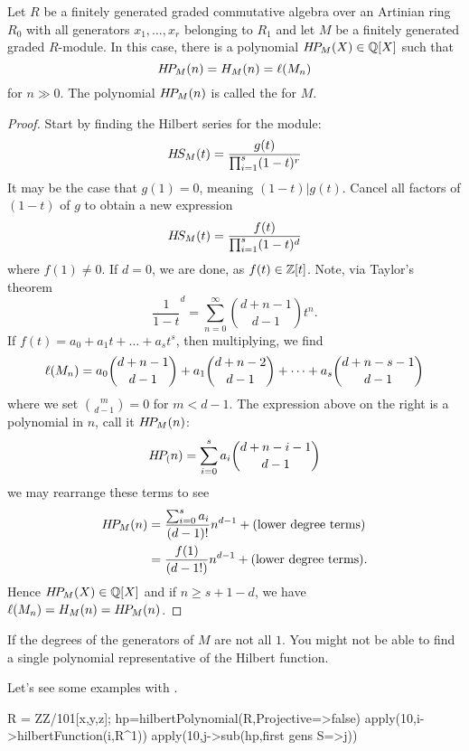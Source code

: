 \documentclass{ximera}
\begin{document}
\begin{corollary}
  Let $R$ be a finitely generated graded commutative algebra over an
  Artinian ring $R_0$ with all generators $x_1,\dots,x_r$ belonging to
  $R_1$ and let $M$ be a finitely generated graded $R$-module. In this
  case, there is a polynomial $H\!P_M(X)\in\mathbb Q[X]$ such that
  \[
  H\!P_M(n) = H_M(n) = \ell(M_n)
  \]
  for $n\gg 0$. The polynomial $H\!P_M(n)$ is called the
   for $M$.
  \begin{proof}
    Start by finding the Hilbert series for the module:
    \[
    H\!S_M(t) = \frac{g(t)}{\prod_{i=1}^s(1-t)^r}
    \]
    It may be the case that $g(1) = 0$, meaning $(1-t)|g(t)$. Cancel
    all factors of $(1-t)$ of $g$ to obtain a new expression
    \[
    H\!S_M(t) = \frac{f(t)}{\prod_{i=1}^s(1-t)^d}
    \]
    where $f(1) \ne 0$. If $d=0$, we are done, as $f(t)\in
    \mathbb Z[t]$. Note, via Taylor's theorem
    \[
    \frac{1}{1-t}^d = \sum_{n=0}^\infty \binom{d+n-1}{d-1}t^n.
    \]
    If $f(t) = a_0 + a_1 t + \dots + a_s t^s$, then multiplying, we find
    \[
    \ell(M_n) = a_0 \binom{d+n-1}{d-1} + a_1 \binom{d+n-2}{d-1} + \dots + a_s \binom{d+n-s-1}{d-1}
    \]
    where we set $\binom{m}{d-1} = 0$ for $m<d-1$. The expression
    above on the right is a polynomial in $n$, call it $H\!P_M(n)$:
    \[
    H\!P_(n) = \sum_{i=0}^s a_i \binom{d+n-i-1}{d-1}
    \]
    we may rearrange these terms to see
    \begin{align*}
    H\!P_M(n) &= \frac{\sum_{i=0}^s a_i}{(d-1)!}n^{d-1} + (\text{lower degree terms})\\
    &= \frac{f(1)}{(d-1!)}n^{d-1}  + (\text{lower degree terms}).
    \end{align*}
    Hence $H\!P_M(X)\in \mathbb Q[X]$ and if $n\ge s+1-d$, we have $\ell(M_n) =
    H_M(n) = H\!P_M(n)$.
    \end{proof}
\end{corollary}

\begin{remark}
   If the degrees of the generators of $M$ are not all $1$. You might
   not be able to find a single polynomial representative of the
   Hilbert function.
\end{remark}

Let's see some examples with \macaulay.

\begin{macaulay2}
R = ZZ/101[x,y,z];
hp=hilbertPolynomial(R,Projective=>false)
apply(10,i->hilbertFunction(i,R^1))
apply(10,j->sub(hp,{first gens S=>j}))
\end{macaulay2}
\end{document}
